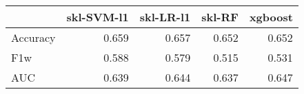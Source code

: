 \begin{tabular}{lrrrr}
\toprule
{} &  skl-SVM-l1 &  skl-LR-l1 &  skl-RF &  xgboost \\
\midrule
Accuracy &       0.659 &      0.657 &   0.652 &    0.652 \\
F1w      &       0.588 &      0.579 &   0.515 &    0.531 \\
AUC      &       0.639 &      0.644 &   0.637 &    0.647 \\
\bottomrule
\end{tabular}
